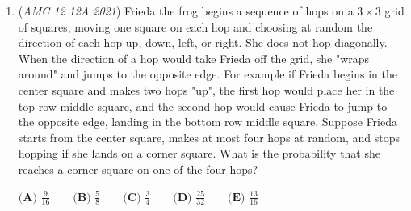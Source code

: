 \begin{enumerate}
 By the Product-to-Sum Identity, we have 
 \begin{align*} \cos \frac{2 \pi}{7} \cos \frac{4 \pi}{7} + \cos \frac{2 \pi}{7} \cos \frac{6 \pi}{7} + \cos \frac{4 \pi}{7} \cos \frac{6 \pi}{7} &= \frac{1}{2} \left(2 \cos \frac{2 \pi}{7} + \cos \frac{4 \pi}{7} + \cos \frac{6 \pi}{7} + \cos \frac{8 \pi}{7} + \cos \frac{10 \pi}{7}\right) \\ &= \frac{1}{2}\left(2 \cos \frac{2 \pi}{7} + 2 \cos \frac{4 \pi}{7} + 2 \cos \frac{6 \pi}{7}\right) \\ &= \cos \frac{2 \pi}{7} + \cos \frac{4 \pi}{7} + \cos \frac{6 \pi}{7} \\ &= -\frac{1}{2}, \end{align*}
so $b = -\frac{1}{2}.$

 By the Product-to-Sum Identity, we have 
 \begin{align*} \cos \frac{2 \pi}{7} \cos \frac{4 \pi}{7} \cos \frac{6 \pi}{7} &= \frac{1}{2}\cos \frac{6 \pi}{7}\left(\cos \frac{2 \pi}{7} + \cos \frac{6 \pi}{7}\right) \\ &= \frac{1}{4}\left(\cos \frac{4 \pi}{7} +  \cos \frac{8 \pi}{7}\right) + \frac{1}{4}\left(1 + \cos \frac{12 \pi}{7}\right) \\ &= \frac{1}{4}\left(1 + \cos\frac{2\pi}{7} + \cos \frac{4\pi}{7} + \cos \frac{6\pi}{7}\right) \\ &= \frac{1}{8}, \end{align*}
so $c = -\frac{1}{8}.$

 Finally, we get $abc=\boxed{\textbf{(D) }\frac{1}{32}}.$



	\item (\textit{AMC 12 12A 2021}) Frieda the frog begins a sequence of hops on a $3\times3$ grid of squares, moving one square on each hop and choosing at random the direction of each hop up, down, left, or right. She does not hop diagonally. When the direction of a hop would take Frieda off the grid, she "wraps around" and jumps to the opposite edge. For example if Frieda begins in the center square and makes two hops "up", the first hop would place her in the top row middle square, and the second hop would cause Frieda to jump to the opposite edge, landing in the bottom row middle square. Suppose Frieda starts from the center square, makes at most four hops at random, and stops hopping if she lands on a corner square. What is the probability that she reaches a corner square on one of the four hops?


 $\textbf{(A) }\frac{9}{16} \qquad \textbf{(B) }\frac{5}{8} \qquad \textbf{(C) }\frac34 \qquad \textbf{(D) }\frac{25}{32}\qquad \textbf{(E) }\frac{13}{16}$


\end{enumerate}
